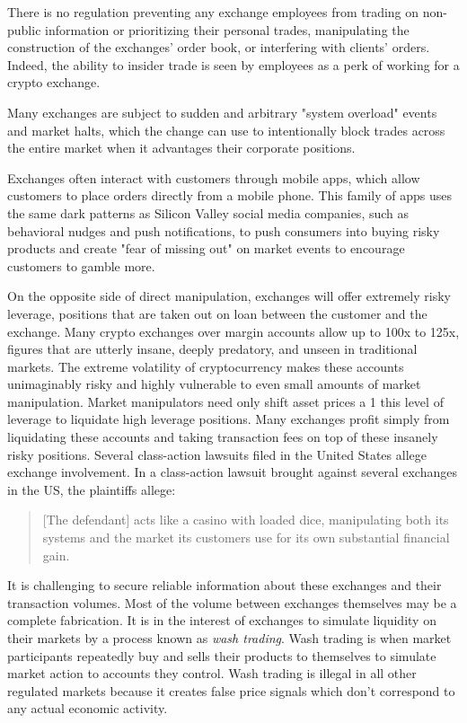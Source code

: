 There is no regulation preventing any exchange employees from trading on
non-public information or prioritizing their personal trades, manipulating the
construction of the exchanges' order book, or interfering with clients' orders.
Indeed, the ability to insider trade is seen by employees as a perk of working
for a crypto exchange.

Many exchanges are subject to sudden and arbitrary "system overload" events and
market halts, which the change can use to intentionally block trades across the
entire market when it advantages their corporate positions.
\cite{ostroff_binance_2021}

Exchanges often interact with customers through mobile apps, which allow
customers to place orders directly from a mobile phone. This family of apps uses
the same dark patterns as Silicon Valley social media companies, such as
behavioral nudges and push notifications, to push consumers into buying risky
products and create "fear of missing out" on market events to encourage
customers to gamble more.

On the opposite side of direct manipulation, exchanges will offer extremely
risky leverage, positions that are taken out on loan between the customer and
the exchange. Many crypto exchanges over margin accounts allow up to 100x to
125x, figures that are utterly insane, deeply predatory, and unseen in
traditional markets. The extreme volatility of cryptocurrency makes these
accounts unimaginably risky and highly vulnerable to even small amounts of
market manipulation. Market manipulators need only shift asset prices a 1%
this level of leverage to liquidate high leverage positions. Many exchanges
profit simply from liquidating these accounts and taking transaction fees on top
of these insanely risky positions. Several class-action lawsuits filed in the
United States allege exchange involvement. In a class-action lawsuit brought
against several exchanges in the US, the plaintiffs allege:

\begin{quote}
{[}The defendant{]} acts like a casino with loaded dice, manipulating
both its systems and the market its customers use for its own
substantial financial gain.
\end{quote}

It is challenging to secure reliable information about these exchanges and their
transaction volumes. Most of the volume between exchanges themselves may be a
complete fabrication. It is in the interest of exchanges to simulate liquidity
on their markets by a process known as \textit{wash trading}. Wash trading is when
market participants repeatedly buy and sells their products to themselves to
simulate market action to accounts they control. Wash trading is illegal in all
other regulated markets because it creates false price signals which don't
correspond to any actual economic activity.

